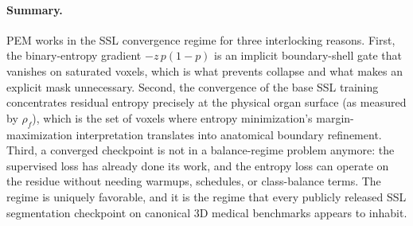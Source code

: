 \paragraph{Summary.}
PEM works in the SSL convergence regime for three interlocking reasons. First, the binary-entropy gradient $-z\,p(1{-}p)$ is an implicit boundary-shell gate that vanishes on saturated voxels, which is what prevents collapse and what makes an explicit mask unnecessary. Second, the convergence of the base SSL training concentrates residual entropy precisely at the physical organ surface (as measured by $\rho_f$), which is the set of voxels where entropy minimization's margin-maximization interpretation translates into anatomical boundary refinement. Third, a converged checkpoint is not in a balance-regime problem anymore: the supervised loss has already done its work, and the entropy loss can operate on the residue without needing warmups, schedules, or class-balance terms. The regime is uniquely favorable, and it is the regime that every publicly released SSL segmentation checkpoint on canonical 3D medical benchmarks appears to inhabit.
